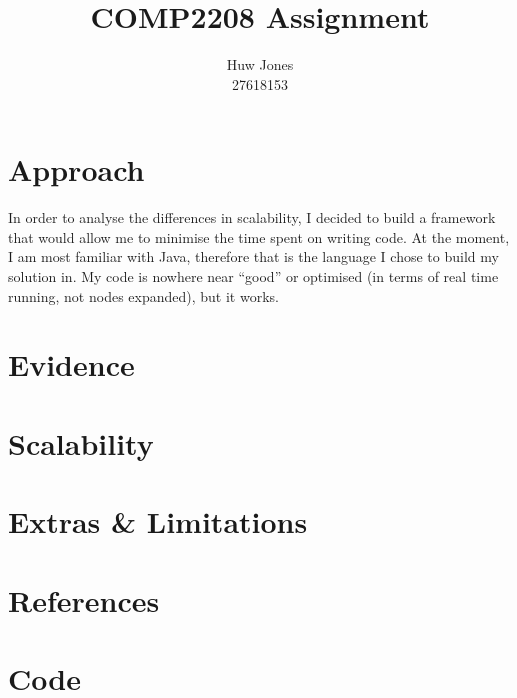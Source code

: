 \documentclass[a4paper]{article}
\author{Huw Jones \\27618153}
\title{COMP2208 Assignment}
\begin{document}
\maketitle
\newpage

\section{Approach}
In order to analyse the differences in scalability, I decided to build a framework that would allow me to minimise the time spent on writing code.
At the moment, I am most familiar with Java, therefore that is the language I chose to build my solution in.
My code is nowhere near ``good'' or optimised (in terms of real time running, not nodes expanded), but it works.

\section{Evidence}

\section{Scalability}

\section{Extras \& Limitations}

\section{References}

\section{Code}
\end{document}
